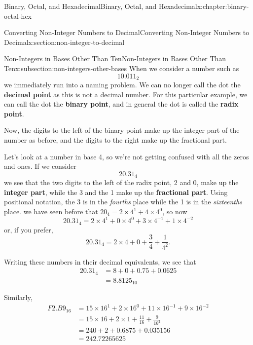 \documentclass[twoside,10pt,]{book}
\newcommand{\terminology}[1]{\textbf{#1}}
\numberwithin{equation}{section}
\newcommand{\amp}{&}
\begin{document}
\begin{chapterptx}{Binary, Octal, and Hexadecimal}{}{Binary, Octal, and Hexadecimal}{}{}{x:chapter:binary-octal-hex}
\begin{sectionptx}{Converting Non-Integer Numbers to Decimal}{}{Converting Non-Integer Numbers to Decimal}{}{}{x:section:non-integer-to-decimal}
\typeout{************************************************}
%
\begin{subsectionptx}{Non-Integers in Bases Other Than Ten}{}{Non-Integers in Bases Other Than Ten}{}{}{x:subsection:non-integers-other-bases}
When we consider a number such as%
\begin{equation*}
10.011_2
\end{equation*}
we immediately run into a naming problem.  We can no longer call the dot the \terminology{decimal point} as this is not a decimal number.  For this particular example, we can call the dot the \terminology{binary point}, and in general the dot is called the \terminology{radix point}.%
\par
Now, the digits to the left of the binary point make up the integer part of the number as before, and the digits to the right make up the fractional part.%
\par
Let's look at a number in base 4, so we're not getting confused with all the zeros and ones.  If we consider%
\begin{equation*}
20.31_4
\end{equation*}
we see that the two digits to the left of the radix point, 2 and 0, make up the \terminology{integer part}, while the 3 and the 1 make up the \terminology{fractional part}.  Using positional notation, the 3 is in the \emph{fourths} place while the 1 is in the \emph{sixteenths} place.  we have seen before that \(20_4=2\times4^1+4\times4^0\), so now%
\begin{equation*}
20.31_4=2\times4^1+0\times4^0+3\times4^{-1}+1\times4^{-2}
\end{equation*}
or, if you prefer,%
\begin{equation*}
20.31_4=2\times4+0+\frac{3}{4}+\frac{1}{4^2}.
\end{equation*}
%
\par
Writing these numbers in their decimal equivalents, we see that%
\begin{align*}
20.31_4 \amp =8+0+0.75+0.0625\\
\amp = 8.8125_{10}
\end{align*}
%
\par
Similarly,%
\begin{align*}
F2.B9_{16} \amp =15\times16^1+2\times16^0+11\times16^{-1}+9\times16^{-2}\\
\amp = 15\times16+2\times1+\frac{11}{16}+\frac{9}{16^2}\\
\amp = 240+2+0.6875+0.035156\\
\amp = 242.72265625
\end{align*}

\end{subsectionptx}
\end{sectionptx}
\end{chapterptx}
\end{document}
